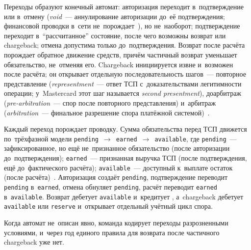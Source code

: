 Переходы образуют конечный автомат: авторизация переходит в~подтверждение или
в~отмену (\textit{void}~--- аннулирование авторизации до~её подтверждения;
  финансовой проводки в~сети
не~порождает~\cite{adyen-glossary,stripe-manual-capture}), но не~наоборот;
подтверждение переходит в~\enquote{рассчитанное} состояние, после чего возможны
возврат или chargeback; отмена допустима только до~подтверждения. Возврат после
расчёта порождает обратное движение средств, причём частичный возврат уменьшает
обязательство, не~отменяя его. Chargeback инициируется извне и~возможен после
расчёта; он открывает отдельную последовательность шагов~--- повторное представление
(\textit{representment}~--- ответ ТСП с~доказательствами легитимности операции;
у~Mastercard этот шаг называется \textit{second presentment}), доарбитраж
(\textit{pre-arbitration}~--- спор после повторного представления) и~арбитраж
(\textit{arbitration}~--- финальное разрешение спора платёжной системой)~\cite{visa-core-rules,mc-chargeback-guide}.

Каждый переход порождает проводку. Сумма обязательства перед ТСП движется
по~трёхфазной модели
\texttt{pending}~$\to$~\texttt{earned}~$\to$~\texttt{available}, где
\texttt{pending}~--- зафиксированное, но ещё не~признанное обязательство (после
авторизации до~подтверждения); \texttt{earned}~--- признанная выручка ТСП
(после подтверждения, ещё до~фактического расчёта); \texttt{available}~---
доступный к~выплате остаток (после
расчёта)~\cite{stripe-balances,adyen-balances}. Авторизация создаёт
\texttt{pending}, подтверждение переводит \texttt{pending} в~\texttt{earned},
отмена обнуляет \texttt{pending}, расчёт переводит \texttt{earned}
в~\texttt{available}. Возврат дебетует \texttt{available} и~кредитует
, а~chargeback дебетует \texttt{available} или
\texttt{reserve} и~открывает отдельный учётный цикл спора.


Когда автомат не~описан явно, команда кодирует переходы разрозненными
условиями, и~через год единого правила для возврата после частичного
chargeback уже нет.

